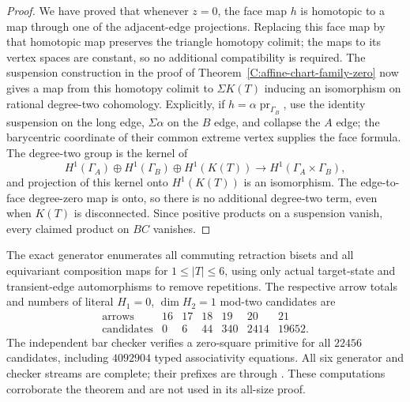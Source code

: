 \begin{proof}
We have proved that whenever $z=0$, the face map $h$ is
homotopic to a map through one of the adjacent-edge
projections.  Replacing this face map by that homotopic map
preserves the triangle homotopy colimit; the maps to its
vertex spaces are constant, so no additional compatibility
is required.  The suspension construction in the proof of
Theorem~\ref{C:affine-chart-family-zero} now gives a map
from this homotopy colimit to $\Sigma K(T)$ inducing an
isomorphism on rational degree-two cohomology.  Explicitly,
if $h=\alpha\operatorname{pr}_{\Gamma_B}$, use the identity
suspension on the long edge, $\Sigma\alpha$ on the $B$ edge,
and collapse the $A$ edge; the barycentric coordinate of
their common extreme vertex supplies the face formula.
The degree-two group is the kernel of
\[
 H^1(\Gamma_A)\oplus H^1(\Gamma_B)\oplus H^1(K(T))
 \longrightarrow H^1(\Gamma_A\times\Gamma_B),
\]
and projection of this kernel onto $H^1(K(T))$ is an
isomorphism.  The edge-to-face degree-zero map is onto,
so there is no additional degree-two term, even when
$K(T)$ is disconnected.  Since positive products on a
suspension vanish, every claimed product on $BC$ vanishes.
\end{proof}

\begin{remark}
\label{C:affine-four-circle-controls}
The exact generator 
enumerates all commuting retraction bisets and all equivariant
composition maps for $1\leq|T|\leq6$, using only actual
target-state and transient-edge automorphisms to remove
repetitions.  The respective arrow totals and numbers of
literal $H_1=0$, $\dim H_2=1$ mod-two candidates are
\[
\begin{array}{c|rrrrrr}
\text{arrows}&16&17&18&19&20&21\\\hline
\text{candidates}&0&6&44&340&2414&19652.
\end{array}
\]
The independent bar checker verifies a zero-square primitive
for all $22456$ candidates, including $4092904$ typed
associativity equations.  All six generator and checker
streams are complete; their prefixes are
 through
.
These computations corroborate the theorem and are not used
in its all-size proof.
\end{remark}
